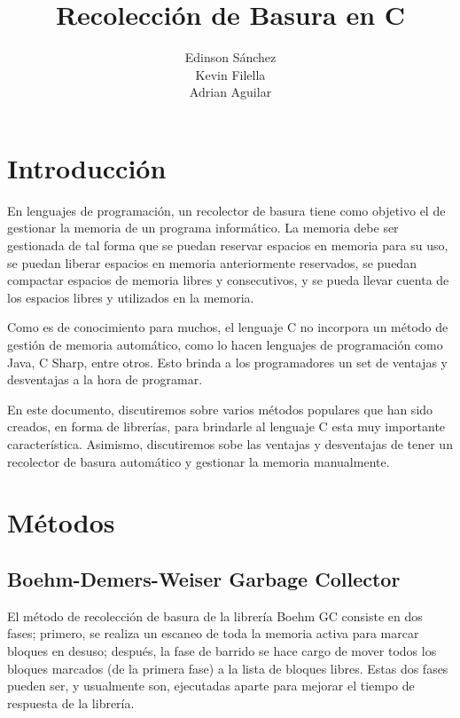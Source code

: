 \documentclass[11pt]{article} %
\title{Recolección de Basura en C}
\author{Edinson Sánchez\\Kevin Filella\\Adrian Aguilar}
\begin{document}
\maketitle



\newpage
\tableofcontents
\newpage

\section{Introducción}
	En lenguajes de programación, un recolector de basura tiene como objetivo el de gestionar la memoria de un programa informático. La memoria debe ser gestionada de tal forma que se puedan reservar espacios en memoria para su uso, se puedan liberar espacios en memoria anteriormente reservados, se puedan compactar espacios de memoria libres y consecutivos, y se pueda llevar cuenta de los espacios libres y utilizados en la memoria.

	Como es de conocimiento para muchos, el lenguaje C no incorpora un método de gestión de memoria automático, como lo hacen lenguajes de programación como Java, C Sharp, entre otros. Esto brinda a los programadores un set de ventajas y desventajas a la hora de programar.

	En este documento, discutiremos sobre varios métodos populares que han sido creados, en forma de librerías, para brindarle al lenguaje C esta muy importante característica. Asimismo, discutiremos sobe las ventajas y desventajas de tener un recolector de basura automático y gestionar la memoria manualmente.

\section{Métodos}

\subsection{Boehm-Demers-Weiser Garbage Collector}
	El método de recolección de basura de la librería Boehm GC consiste en dos fases; primero, se realiza un escaneo de toda la memoria activa para marcar bloques en desuso; después, la fase de barrido se hace cargo de mover todos los bloques marcados (de la primera fase) a la lista de bloques libres. Estas dos fases pueden ser, y usualmente son, ejecutadas aparte para mejorar el tiempo de respuesta de la librería.
\end{document}

